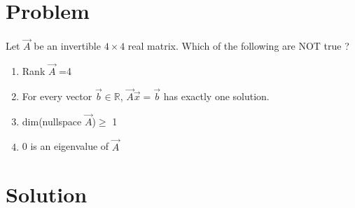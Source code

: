 \documentclass[journal,12pt]{IEEEtran}
\begin{document}
\section{\textbf{Problem}}
Let $\vec{A}$ be an invertible $4 \times 4$ real matrix. Which of the following are NOT true ? 
\begin{enumerate}
\item  Rank $\vec{A}$ =4
\item For every vector $\vec{b} \in \mathbb{R}$, $\vec{A}\vec{x}=\vec{b}$ has exactly one solution. 
\item dim(nullspace $\vec{A}$)$\geq$ 1
\item 0 is an eigenvalue of $\vec{A}$
\end{enumerate}
\section{\textbf{Solution}}
\renewcommand{\thetable}{1}
\end{document}
